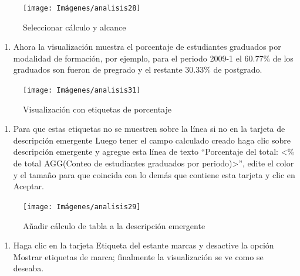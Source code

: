 \documentclass[
]{book}
\providecommand{\tightlist}{%
  \setlength{\itemsep}{0pt}\setlength{\parskip}{0pt}}
\begin{document}
\begin{figure}

{\centering \texttt{[image: Imágenes/analisis28]} 

}

\caption{Seleccionar cálculo y alcance}\label{fig:editarcalculodetabla-fig}
\end{figure}

\begin{enumerate}
\def\labelenumi{\arabic{enumi}.}
\setcounter{enumi}{4}
\tightlist
\item
  Ahora la visualización muestra el porcentaje de estudiantes graduados por modalidad de formación, por ejemplo, para el periodo 2009-1 el \(60.77\%\) de los graduados son fueron de pregrado y el restante \(30.33\%\) de postgrado.
\end{enumerate}

\begin{figure}

{\centering \texttt{[image: Imágenes/analisis31]} 

}

\caption{Visualización con etiquetas de porcentaje}\label{fig:etiquetasenporcentaje-fig}
\end{figure}

\begin{enumerate}
\def\labelenumi{\arabic{enumi}.}
\setcounter{enumi}{5}
\tightlist
\item
  Para que estas etiquetas no se muestren sobre la línea si no en la tarjeta de descripción emergente Luego tener el campo calculado creado haga clic sobre descripción emergente y agregue esta línea de texto ``Porcentaje del total: \textless\% de total AGG(Conteo de estudiantes graduados por periodo)\textgreater{}'', edite el color y el tamaño para que coincida con lo demás que contiene esta tarjeta y clic en Aceptar.
\end{enumerate}

\begin{figure}

{\centering \texttt{[image: Imágenes/analisis29]} 

}

\caption{Añadir cálculo de tabla a la descripción emergente}\label{fig:añadircalculodetablaadescripcion-fig}
\end{figure}

\begin{enumerate}
\def\labelenumi{\arabic{enumi}.}
\setcounter{enumi}{5}
\tightlist
\item
  Haga clic en la tarjeta Etiqueta del estante marcas y desactive la opción Mostrar etiquetas de marca; finalmente la visualización se ve como se deseaba.
\end{enumerate}
\end{document}
